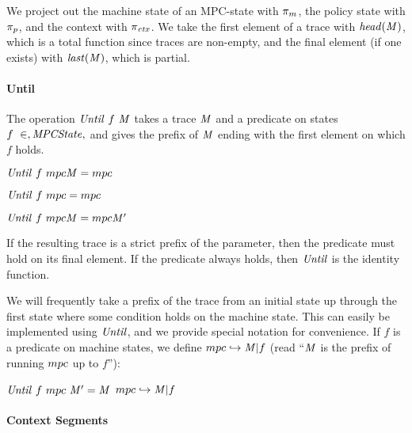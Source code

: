 \documentclass[acmsmall,review,anonymous]{acmart}\settopmatter{printfolios=true,printccs=false,printacmref=false}
\begin{document}
We project out the machine state of an MPC-state with \(\pi_m\), the
policy state with \(\pi_p\), and the context with \(\pi_{\mathit{ctx}}\).
We take the first element of a trace with \(\mathit{head}(\mathit{M})\), which is a total
function since traces are non-empty, and the final element (if one exists) with
\(\mathit{last}(\mathit{M})\), which is partial.

\paragraph*{Until}
The operation \(\mathit{Until} ~ f ~ \mathit{M}\) takes a trace \(\mathit{M}\)
and a predicate on states \(f ~ \in,\mathit{MPCState},\) and gives the prefix of
\(\mathit{M}\) ending with the first element on which \(f\) holds.

\begin{center}
  \begin{minipage}{.3\textwidth}
             {\(\mathit{Until} ~ f ~ mpc\mathit{M} = mpc\)}
  \end{minipage}
%
  \begin{minipage}{.3\textwidth}
    \judgment{}
             {\(\mathit{Until} ~ f ~ mpc = mpc\)}
%
  \end{minipage}
  \begin{minipage}{.3\textwidth}
                {\(\mathit{Until} ~ f ~ mpc\mathit{M} = mpc\mathit{M}'\)}
  \end{minipage}
\end{center}
%
If the resulting trace is a strict prefix of the parameter, then the
predicate must hold on its final element. If the predicate always holds, then
\(\mathit{Until}\) is the identity function.

We will frequently take a prefix of the trace from an initial state up
through the first state where some condition holds on the machine state.
This can easily be implemented using \(\mathit{Until}\), and we provide special notation
for convenience.
%
If \(f\) is a predicate on machine states, we define \(mpc
\hookrightarrow \mathit{M} | f\) (read ``\(\mathit{M}\) is the prefix of
running \(mpc\) up to \(f\)''):
%
\begin{center}
            {\(\mathit{Until} ~ f ~ mpc ~ \mathit{M}' = \mathit{M}\)}
            {\(mpc \hookrightarrow \mathit{M} | f\)}
\end{center}

\paragraph*{Context Segments}
\end{document}
